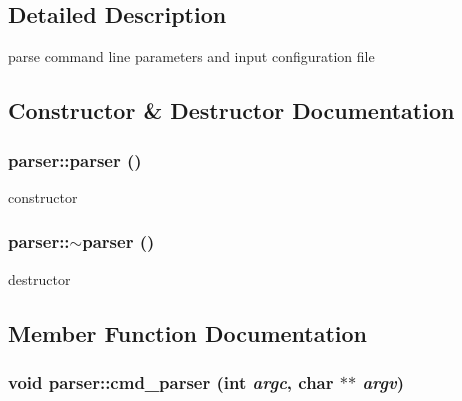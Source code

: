 

\subsection{Detailed Description}
parse command line parameters and input configuration file 

\subsection{Constructor \& Destructor Documentation}
\hypertarget{classparser_ac4cb16e924a735dfb5837772afa1a1a9}{
\subsubsection[{parser}]{\setlength{\rightskip}{0pt plus 5cm}parser::parser ()}}
\label{classparser_ac4cb16e924a735dfb5837772afa1a1a9}


constructor 

\hypertarget{classparser_acdd4eb1b51b876954c2f7605f65388ce}{
\subsubsection[{$\sim$parser}]{\setlength{\rightskip}{0pt plus 5cm}parser::$\sim$parser ()}}
\label{classparser_acdd4eb1b51b876954c2f7605f65388ce}


destructor 



\subsection{Member Function Documentation}
\hypertarget{classparser_ac578bbb7b49c579bc4520a806fb316c5}{
\subsubsection[{cmd\_\-parser}]{\setlength{\rightskip}{0pt plus 5cm}void parser::cmd\_\-parser (int {\em argc}, \/  char $\ast$$\ast$ {\em argv})}}
\label{classparser_ac578bbb7b49c579bc4520a806fb316c5}


